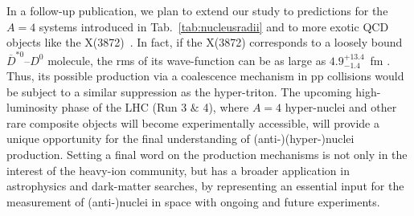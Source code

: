 In a follow-up publication, we plan to extend our study to predictions for the $A=4$ systems introduced in Tab.~\ref{tab:nucleusradii} and to more exotic QCD objects like the X(3872)~\cite{Esposito:2015fsa, Cho:2017dcy}. 
In fact, if the X(3872) corresponds to a loosely bound $\overline{D}^{*0}$--$D^{0}$ molecule, the rms of its wave-function can be as large as $4.9^{+13.4}_{-1.4}$~fm \cite{Artoisenet:2010uu}. Thus, its possible production via a coalescence mechanism in pp collisions would be subject to a similar suppression as the hyper-triton. 
The upcoming high-luminosity phase of the LHC (Run 3 $\&$ 4), where $A = 4$ hyper-nuclei and other rare composite objects will become experimentally accessible, will provide a unique opportunity for the final understanding of (anti-)(hyper-)nuclei production.
Setting a final word on the production mechanisms is not only in the interest of the heavy-ion community, but has a broader application in astrophysics and dark-matter searches, by representing an essential input for the measurement of (anti-)nuclei in space with ongoing \cite{Alcaraz:2000ss, Poulin:2018wzu} and future \cite{AMS100, Aramaki:2015laa} experiments. 



